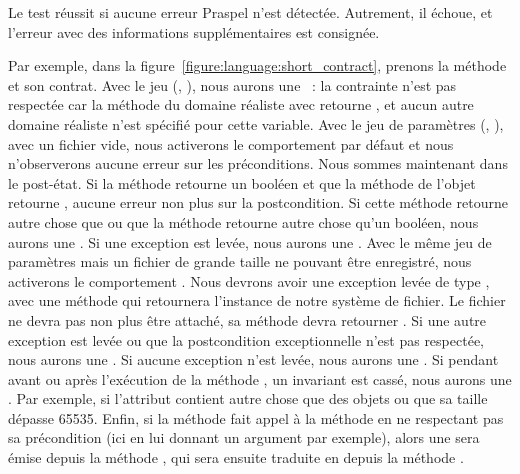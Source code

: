 Le test réussit si aucune erreur Praspel n'est détectée. Autrement, il échoue,
et l'erreur avec des informations supplémentaires est consignée.

Par exemple, dans la figure~\ref{figure:language:short_contract}, prenons la
méthode  et son contrat.
%
Avec le jeu (, ), nous aurons une ~: la contrainte  n'est pas respectée car la
méthode  du domaine réaliste  avec  retourne , et aucun autre domaine réaliste n'est spécifié
pour cette variable.
%
Avec le jeu de paramètres (, ), avec un fichier
vide, nous activerons le comportement par défaut et nous n'observerons aucune
erreur sur les préconditions. Nous sommes maintenant dans le post-état. Si la
méthode  retourne un booléen et que la méthode  de
l'objet  retourne , aucune erreur non plus sur la
postcondition.  Si cette méthode retourne autre chose que  ou que la
méthode  retourne autre chose qu'un booléen, nous aurons une
. Si une exception est levée, nous aurons une
.
%
Avec le même jeu de paramètres mais un fichier de grande taille ne pouvant être
enregistré, nous activerons le comportement . Nous devrons avoir une
exception levée de type , avec une méthode
 qui retournera l'instance de notre système de fichier. Le
fichier ne devra pas non plus être attaché, \ie sa méthode 
devra retourner . Si une autre exception est levée ou que la
postcondition exceptionnelle n'est pas respectée, nous aurons une
. Si aucune exception n'est levée, nous aurons une
.
%
Si pendant avant ou après l'exécution de la méthode , un invariant
est cassé, nous aurons une . Par exemple, si
l'attribut  contient autre chose que des objets  ou que
sa taille dépasse 65535.
%
Enfin, si la méthode  fait appel à la méthode  en ne
respectant pas sa précondition (ici en lui donnant un argument par exemple),
alors une  sera émise depuis la méthode
, qui sera ensuite traduite en  depuis la méthode .
